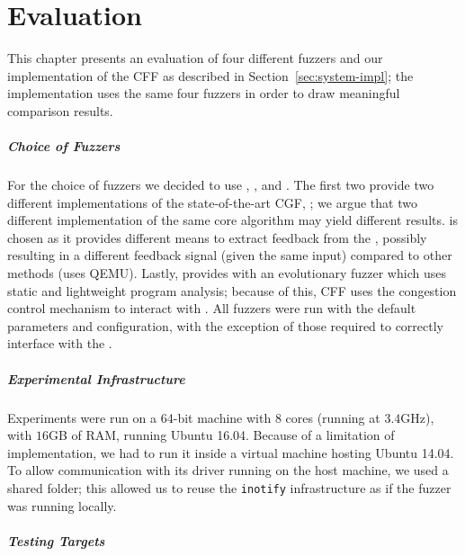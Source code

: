 \chapter{Evaluation}
\label{chap:evaluation}


This chapter presents an evaluation of four different fuzzers and our
implementation of the \acl{CFF} as described in Section~\ref{sec:system-impl};
the implementation uses the same four fuzzers in order to draw meaningful
comparison results.

\paragraph{Choice of Fuzzers}

For the choice of fuzzers we decided to use \aflfast, \fairfuzz, \honggfuzz\@
and \vuzzer. The first two provide two different implementations of the
state-of-the-art \ac{CGF}, \afl; we argue that two different implementation of
the same core algorithm may yield different results. \honggfuzz\@ is chosen as
it provides different means to extract feedback from the \sut, possibly
resulting in a different feedback signal (given the same input) compared to
other methods (\eg\@ \afl\@ uses QEMU). Lastly, \vuzzer\@ provides with an
evolutionary fuzzer which uses static and lightweight program analysis; because
of this, \ac{CFF} uses the congestion control mechanism to interact with
\vuzzer. All fuzzers were run with the default parameters and configuration,
with the exception of those required to correctly interface with the \sut.

\paragraph{Experimental Infrastructure}

Experiments were run on a 64-bit machine with $8$ cores (running at $3.4$GHz),
with $16$GB of RAM, running Ubuntu 16.04. Because of a limitation of \vuzzer\@
implementation, we had to run it inside a virtual machine hosting Ubuntu 14.04.
To allow communication with its driver running on the host machine, we used a
shared folder; this allowed us to reuse the \texttt{inotify} infrastructure as
if the fuzzer was running locally.

\paragraph{Testing Targets}

